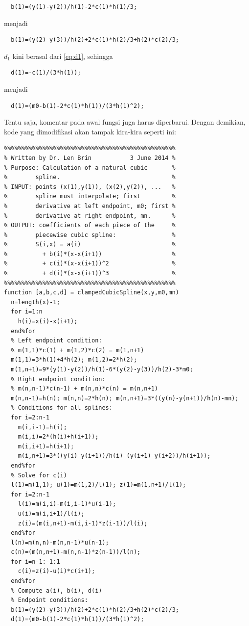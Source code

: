 \begin{description}
\begin{verbatim}
  b(1)=(y(1)-y(2))/h(1)-2*c(1)*h(1)/3;
\end{verbatim}menjadi\begin{verbatim}
  b(1)=(y(2)-y(3))/h(2)+2*c(1)*h(2)/3+h(2)*c(2)/3;
\end{verbatim}$d_{1}$ kini berasal dari \ref{eq:d1}, sehingga\begin{verbatim}
  d(1)=-c(1)/(3*h(1));
\end{verbatim}menjadi\begin{verbatim}
  d(1)=(m0-b(1)-2*c(1)*h(1))/(3*h(1)^2);
\end{verbatim}Tentu saja, komentar pada awal fungsi juga harus diperbarui. Dengan
demikian, kode yang dimodifikasi akan tampak kira-kira seperti ini:\begin{verbatim}
%%%%%%%%%%%%%%%%%%%%%%%%%%%%%%%%%%%%%%%%%%%%%%%%%
% Written by Dr. Len Brin           3 June 2014 %
% Purpose: Calculation of a natural cubic       %
%        spline.                                %
% INPUT: points (x(1),y(1)), (x(2),y(2)), ...   %
%        spline must interpolate; first         %
%        derivative at left endpoint, m0; first %
%        derivative at right endpoint, mn.      %
% OUTPUT: coefficients of each piece of the     %
%        piecewise cubic spline:                %
%        S(i,x) = a(i)                          %
%          + b(i)*(x-x(i+1))                    %
%          + c(i)*(x-x(i+1))^2                  %
%          + d(i)*(x-x(i+1))^3                  %
%%%%%%%%%%%%%%%%%%%%%%%%%%%%%%%%%%%%%%%%%%%%%%%%%
function [a,b,c,d] = clampedCubicSpline(x,y,m0,mn)
  n=length(x)-1;
  for i=1:n
    h(i)=x(i)-x(i+1);
  end%for
  % Left endpoint condition:
  % m(1,1)*c(1) + m(1,2)*c(2) = m(1,n+1)
  m(1,1)=3*h(1)+4*h(2); m(1,2)=2*h(2);
  m(1,n+1)=9*(y(1)-y(2))/h(1)-6*(y(2)-y(3))/h(2)-3*m0;
  % Right endpoint condition:
  % m(n,n-1)*c(n-1) + m(n,n)*c(n) = m(n,n+1)
  m(n,n-1)=h(n); m(n,n)=2*h(n); m(n,n+1)=3*((y(n)-y(n+1))/h(n)-mn);
  % Conditions for all splines:
  for i=2:n-1
    m(i,i-1)=h(i);
    m(i,i)=2*(h(i)+h(i+1));
    m(i,i+1)=h(i+1);
    m(i,n+1)=3*((y(i)-y(i+1))/h(i)-(y(i+1)-y(i+2))/h(i+1));
  end%for
  % Solve for c(i)
  l(1)=m(1,1); u(1)=m(1,2)/l(1); z(1)=m(1,n+1)/l(1);
  for i=2:n-1
    l(i)=m(i,i)-m(i,i-1)*u(i-1);
    u(i)=m(i,i+1)/l(i);
    z(i)=(m(i,n+1)-m(i,i-1)*z(i-1))/l(i);
  end%for
  l(n)=m(n,n)-m(n,n-1)*u(n-1);
  c(n)=(m(n,n+1)-m(n,n-1)*z(n-1))/l(n);
  for i=n-1:-1:1
    c(i)=z(i)-u(i)*c(i+1);
  end%for
  % Compute a(i), b(i), d(i)
  % Endpoint conditions:
  b(1)=(y(2)-y(3))/h(2)+2*c(1)*h(2)/3+h(2)*c(2)/3;
  d(1)=(m0-b(1)-2*c(1)*h(1))/(3*h(1)^2);

\end{verbatim}
\end{description}
